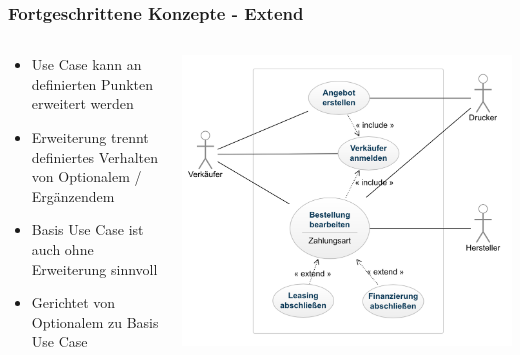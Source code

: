 \begin{frame}
\frametitle{Fortgeschrittene Konzepte - Extend}
	\begin{columns}
		\begin{column}{.4\textwidth}
			\scriptsize
			\begin{itemize}
				\item Use Case kann an definierten Punkten erweitert werden
				\item Erweiterung trennt definiertes Verhalten von Optionalem / Ergänzendem
				\item Basis Use Case ist auch ohne Erweiterung sinnvoll
				\item Gerichtet von Optionalem zu Basis Use Case
			\end{itemize}
			\normalsize
		\end{column}
		\begin{column}{.6\textwidth}
			\center
			\includegraphics[width=1\textwidth,
			keepaspectratio=true]{bilder/extend.png}
		\end{column}
	\end{columns}
\end{frame}

